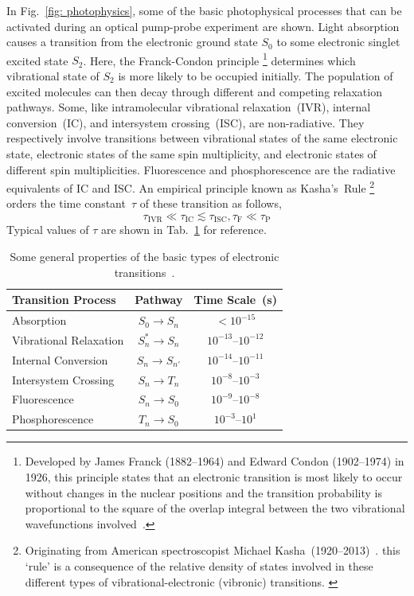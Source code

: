 In Fig.~\ref{fig: photophysics}, some of the basic photophysical processes that
can be activated during an optical pump-probe experiment are shown.
Light absorption causes a transition from the electronic ground state $S_0$
to some electronic singlet excited state $S_2$.
Here, the Franck-Condon principle%
\footnote{Developed by James Franck (1882--1964) and Edward Condon (1902--1974) in 1926,
this principle states that an electronic transition is
most likely to occur without changes in the nuclear positions and
the transition probability is proportional to the square of the overlap integral between
the two vibrational wavefunctions involved~\cite{Franck1926, Condon1926}.\label{fn: franck-condon}}
determines which vibrational state of $S_2$ is more likely to be occupied initially.
The population of excited molecules can then decay through different
and competing relaxation pathways.
Some, like intramolecular vibrational relaxation~(IVR),
internal conversion~(IC), and intersystem crossing~(ISC), are non-radiative.
They respectively involve transitions between
vibrational states of the same electronic state,
electronic states of the same spin multiplicity, and
electronic states of different spin multiplicities.
Fluorescence and phosphorescence are the radiative equivalents of IC and ISC.
%
An empirical principle known as Kasha's~Rule%
\footnote{Originating from American spectroscopist Michael Kasha~(1920--2013)~\cite{Kasha1950}.
this `rule' is a consequence of the relative density of states
involved in these different types of vibrational-electronic (vibronic) transitions. \label{fn: Kasha}}
orders the time constant~$\tau$ of these transition as follows,
%
\begin{equation}
  \tau_\text{IVR} \ll \tau_\text{IC} \lesssim \tau_\text{ISC}, \tau_\text{F} \ll \tau_\text{P}
\end{equation}
%
Typical values of $\tau$ are shown in Tab.~\ref{tab: transitions} for reference.
%
\begin{table}[t!]
  \centering
  {\renewcommand{\arraystretch}{1.5}
  \begin{tabular}{l c c}
    \toprule
    Transition Process & Pathway & Time Scale~(s)\\
    \midrule
    Absorption & $ S_0 \rightarrow S_n $ & $<10^{-15}$ \\
    Vibrational Relaxation & $ S_n^* \rightarrow S_n $ & $10^{-13}$--$10^{-12}$ \\
    Internal Conversion & $ S_{n} \rightarrow S_{n'} $ & $10^{-14}$--$10^{-11}$ \\
    Intersystem Crossing & $ S_n \rightarrow T_n $ & $10^{-8}$--$10^{-3}$ \\
    Fluorescence & $ S_n \rightarrow S_0 $ & $10^{-9}$--$10^{-8}$ \\
    Phosphorescence & $ T_n \rightarrow S_0 $ & $10^{-3}$--$10^{1}$ \\
    \bottomrule
  \end{tabular}
  }
  \caption{Some general properties of the basic types of electronic transitions~\cite{Jaffe1966}.}
  \label{tab: transitions}
\end{table}

